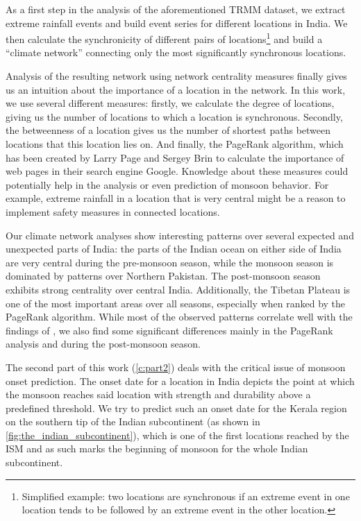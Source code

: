 As a first step in the analysis of the aforementioned TRMM dataset, we extract extreme rainfall events and build event series for different locations in India. We then calculate the synchronicity of different pairs of locations\footnote{Simplified example: two locations are synchronous if an extreme event in one location tends to be followed by an extreme event in the other location.} and build a ``climate network'' connecting only the most significantly synchronous locations.

Analysis of the resulting network using network centrality measures finally gives us an intuition about the importance of a location in the network. In this work, we use several different measures: firstly, we calculate the degree of locations, giving us the number of locations to which a location is synchronous. Secondly, the betweenness of a location gives us the number of shortest paths between locations that this location lies on. And finally, the PageRank algorithm, which has been created by Larry Page and Sergey Brin to calculate the importance of web pages in their search engine Google. Knowledge about these measures could potentially help in the analysis or even prediction of monsoon behavior. For example, extreme rainfall in a location that is very central might be a reason to implement safety measures in connected locations.

Our climate network analyses show interesting patterns over several expected and unexpected parts of India: the parts of the Indian ocean on either side of India are very central during the pre-monsoon season, while the monsoon season is dominated by patterns over Northern Pakistan. The post-monsoon season exhibits strong centrality over central India. Additionally, the Tibetan Plateau is one of the most important areas over all seasons, especially when ranked by the PageRank algorithm. While most of the observed patterns correlate well with the findings of \citet{Stolbova.2015}, we also find some significant differences mainly in the PageRank analysis and during the post-monsoon season.

The second part of this work (\cref{c:part2}) deals with the critical issue of monsoon onset prediction. The onset date for a location in India depicts the point at which the monsoon reaches said location with strength and durability above a predefined threshold. We try to predict such an onset date for the Kerala region on the southern tip of the Indian subcontinent (as shown in \cref{fig:the_indian_subcontinent}), which is one of the first locations reached by the ISM and as such marks the beginning of monsoon for the whole Indian subcontinent.

